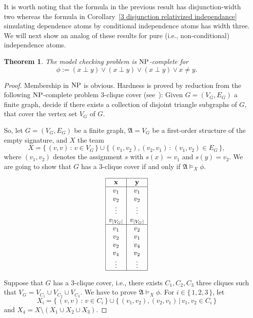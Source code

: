 \documentclass{article}
\theoremstyle{plain}
\newtheorem{theorem}{Theorem}
\theoremstyle{definition}
\newcommand{\mA}{{\mathfrak A}}
\newcommand{\np}{{\rm NP}}
\newcommand{\col}[1]{\mathbf{#1}}
\begin{document}
It is worth noting that the formula in the previous result has disjunction-width two whereas the formula in Corollary~\ref{3 disjunction relativized independance} simulating dependence atoms by conditional independence atoms has width three. We will next show  an analog of these results for  pure (i.e., non-conditional) independence atoms. 

\begin{theorem}\label{pure3-disjunction}
	The model checking problem 	is $\np$-complete for  
	$$\phi := \left(x \perp y\right) \vee \left(x \perp y\right) \vee \left(x \perp y\right) \vee x \neq y.$$
\end{theorem}


\begin{proof} Membership in $\np$ is obvious. Hardness is proved by reduction from the following $\np$-complete problem $3$-clique cover (see~\cite{GareyJ1979}): Given $G=(V_G,E_G)$ a finite graph, decide if there exists a collection of disjoint triangle subgraphs of $G$, that cover the vertex set $V_G$ of $G$.

	So, let $G=(V_G,E_G)$ be a finite graph, $\mA = V_G $ be a first-order structure of the empty signature, and $X$ the team
	 $$X = \{\,(v,v) \, : \, v \in V_G\,\}\cup \{\,(v_1,v_2), (v_2,v_1) \, : \, (v_1,v_2) \in E_G\,\},$$
	  where $(v_1,v_2)$  denotes the assignment $s$ with $s(x)=v_1$ and  $s(y)=v_2$.
		 We are going to show that $G$ has a $3$-clique cover if and only if $\mA \models_X \phi$.
	 
	 $$\begin{array}{|c|c|}
		\hline
		\col x & \col y \\
		\hline
		v_1 & v_1 \\
		v_2 & v_2 \\
		\vdots & \vdots \\
		v_{|V_G|} & v_{|V_G|} \\
		\hline
		v_1 & v_2 \\
		v_2 & v_1 \\
		v_2 & v_4 \\
		v_4 & v_2 \\
		\vdots & \vdots \\
		\hline
	\end{array}$$
	


Suppose that $G$ has a $3$-clique cover, i.e., there exists $C_1,C_2,C_3$ three cliques such that $V_G = V_{C_1} \cup V_{C_2} \cup V_{C_3}$. We have to prove  $\mA \models_X \phi$. For $i \in \{\,1,2,3\,\}$, let $$X_i = \{\,(v,v)\, : \, v \in C_i\,\} \cup  \{\,(v_1,v_2), (v_2,v_1)\, |\, v_1,v_2 \in C_i\,\}$$ and $X_4 = X\setminus (X_1\cup X_2 \cup X_3)$.
	 

\end{proof}
\end{document}
